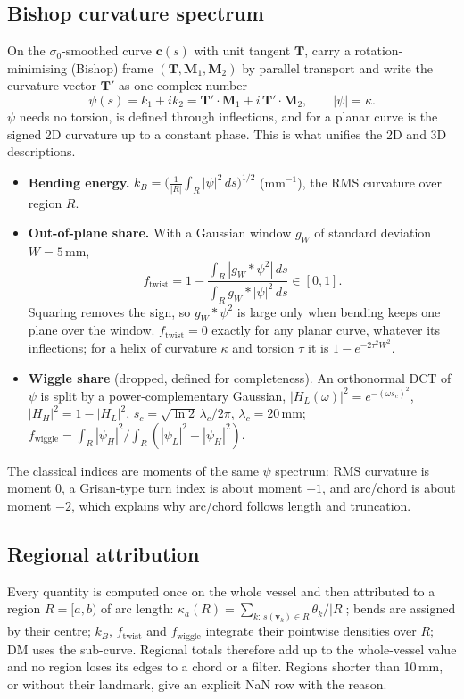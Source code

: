 \documentclass[11pt,a4paper]{article}
\newcommand{\ka}{\kappa_a}
\begin{document}
\subsection{Bishop curvature spectrum}\label{sec:bishop}
On the $\sigma_0$-smoothed curve $\mathbf{c}(s)$ with unit tangent $\mathbf{T}$, carry a rotation-minimising
(Bishop) frame $(\mathbf{T},\mathbf{M}_1,\mathbf{M}_2)$ by parallel transport and write the curvature vector
$\mathbf{T}'$ as one complex number
\[
  \psi(s) = k_1 + i k_2 = \mathbf{T}'\cdot\mathbf{M}_1 + i\,\mathbf{T}'\cdot\mathbf{M}_2, \qquad |\psi| = \kappa .
\]
$\psi$ needs no torsion, is defined through inflections, and for a planar curve is the signed 2D curvature
up to a constant phase. This is what unifies the 2D and 3D descriptions.

\begin{itemize}
\item \textbf{Bending energy.} $\displaystyle k_B = \Big(\frac{1}{|R|}\int_R |\psi|^2\,ds\Big)^{1/2}$ (mm$^{-1}$),
  the RMS curvature over region $R$.
\item \textbf{Out-of-plane share.} With a Gaussian window $g_W$ of standard deviation $W=5$\,mm,
  \[
    f_{\text{twist}} = 1 - \frac{\int_R |g_W * \psi^2|\,ds}{\int_R g_W * |\psi|^2\,ds}\in[0,1].
  \]
  Squaring removes the sign, so $g_W*\psi^2$ is large only when bending keeps one plane over the window.
  $f_{\text{twist}}=0$ exactly for any planar curve, whatever its inflections; for a helix of curvature
  $\kappa$ and torsion $\tau$ it is $1-e^{-2\tau^2W^2}$.
\item \textbf{Wiggle share} (dropped, defined for completeness). An orthonormal DCT of $\psi$ is split by a
  power-complementary Gaussian, $|H_L(\omega)|^2 = e^{-(\omega s_c)^2}$, $|H_H|^2 = 1-|H_L|^2$,
  $s_c = \sqrt{\ln 2}\,\lambda_c/2\pi$, $\lambda_c=20$\,mm; $f_{\text{wiggle}} = \int_R|\psi_H|^2/\int_R(|\psi_L|^2+|\psi_H|^2)$.
\end{itemize}
The classical indices are moments of the same $\psi$ spectrum: RMS curvature is moment 0, a Grisan-type
turn index is about moment $-1$, and arc/chord is about moment $-2$, which explains why arc/chord follows
length and truncation.

\subsection{Regional attribution}
Every quantity is computed once on the whole vessel and then attributed to a region $R=[a,b)$ of arc length:
$\ka(R) = \sum_{k:\,s(\mathbf{v}_k)\in R}\theta_k/|R|$; bends are assigned by their centre; $k_B$,
$f_{\text{twist}}$ and $f_{\text{wiggle}}$ integrate their pointwise densities over $R$; DM uses the
sub-curve. Regional totals therefore add up to the whole-vessel value and no region loses its edges to a
chord or a filter. Regions shorter than 10\,mm, or without their landmark, give an explicit NaN row with the reason.
\end{document}
